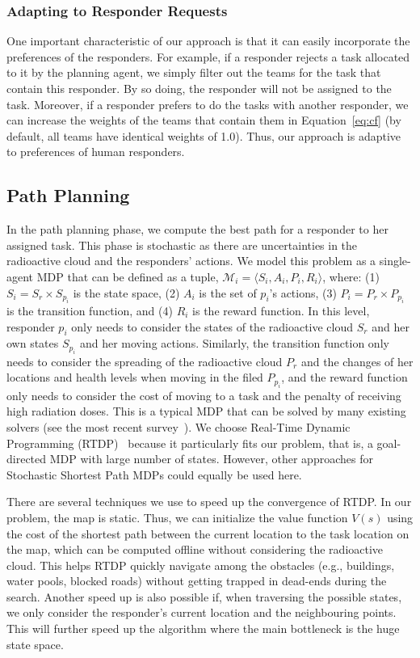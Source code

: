 \subsubsection{Adapting to Responder Requests}\label{sec:adaptive}
\noindent One important characteristic of our approach is that it can easily
incorporate the preferences of the responders. For example, if a
responder rejects a task allocated to it by the planning agent, we
simply filter out the teams for the task that contain this
responder. By so doing, the responder will not be assigned to the
task. Moreover, if a responder prefers to do the tasks with another
responder, we can increase the weights of the teams that
contain them in Equation~\ref{eq:cf} (by default, all teams
have identical weights of 1.0). Thus, our approach is adaptive to
 preferences of human responders.

\subsection{Path Planning}
\label{sec:pathplanning}

\noindent In the path planning phase, we compute the best path for
a responder to her assigned task. This phase is stochastic as there
are uncertainties in the radioactive cloud and the responders'
actions. We model this problem as a single-agent MDP that can be
defined as a tuple, $\mathcal{M}_i = \langle S_i, A_i, P_i, R_i
\rangle$, where: (1) $S_i = S_r \times S_{p_i}$ is the state space,
(2) $A_i$ is the set of $p_i$'s actions, (3) $P_i = P_r \times
P_{p_i}$ is the transition function, and (4) $R_i$ is the reward
function. In this level, responder $p_i$ only needs to consider the
states of the radioactive cloud $S_r$ and her own states $S_{p_i}$
and her moving actions. Similarly, the transition function only
needs to consider the spreading of the radioactive cloud $P_r$ and
the changes of her locations and health levels when moving in the
filed $P_{p_i}$, and the reward function only needs to consider the
cost of moving to a task and the penalty of receiving high
radiation doses. This is a typical MDP that can be solved by many
existing solvers (see the most recent
survey~\cite{kolobov2012planning}). We choose Real-Time Dynamic
Programming (RTDP)~\cite{barto1995learning} because it particularly
fits  our problem, that is, a goal-directed MDP with large number
of states. However, other approaches for Stochastic Shortest Path
MDPs could equally be used here.

There are several techniques we use to speed up the convergence of
RTDP. In our problem, the map is static. Thus, we can initialize
the value function $V(s)$ using the cost of the shortest path
between the current location to the task location on the map, which
can be computed offline without considering the radioactive cloud.
This helps RTDP quickly navigate among the obstacles (e.g.,
buildings, water pools, blocked roads) without getting trapped in
dead-ends during the search. Another speed up is also possible if,
when traversing the possible states, we only consider the
responder's current location and the neighbouring points. This will
further speed up the algorithm where the main bottleneck is the
huge state space.

